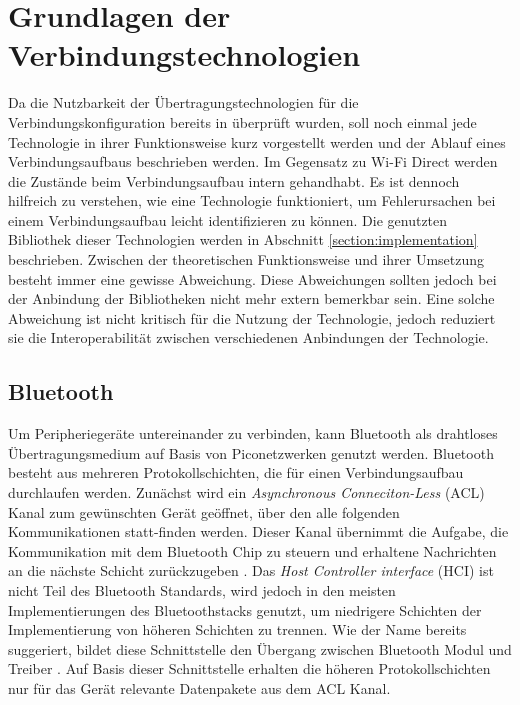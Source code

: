 \section{Grundlagen der Verbindungstechnologien}
	Da die Nutzbarkeit der Übertragungstechnologien für die Verbindungskonfiguration bereits in \cite{aiProject} überprüft wurden, soll noch einmal jede Technologie in ihrer Funktionsweise kurz vorgestellt werden und der Ablauf eines Verbindungsaufbaus beschrieben werden. Im Gegensatz zu Wi-Fi Direct werden die Zustände beim Verbindungsaufbau intern gehandhabt. Es ist dennoch hilfreich zu verstehen, wie eine Technologie funktioniert, um Fehlerursachen bei einem Verbindungsaufbau \linebreak leicht identifizieren zu können. Die genutzten Bibliothek dieser Technologien werden in Abschnitt \ref{section:implementation} beschrieben. Zwischen der theoretischen Funktionsweise und ihrer Umsetzung besteht immer eine gewisse Abweichung. Diese Abweichungen sollten jedoch bei der Anbindung der Bibliotheken nicht mehr extern bemerkbar sein. Eine solche Abweichung ist nicht kritisch für die Nutzung der Technologie, jedoch reduziert sie die Interoperabilität zwischen verschiedenen Anbindungen der Technologie.
	
	\subsection{Bluetooth}
	Um Peripheriegeräte untereinander zu verbinden, kann Bluetooth als drahtloses Übertragungsmedium auf Basis von Piconetzwerken genutzt werden.
	Bluetooth besteht aus mehreren Protokollschichten, die für einen Verbindungsaufbau durchlaufen werden. Zunächst wird ein {\it Asynchronous Conneciton-Less} (ACL) Kanal zum gewünschten Gerät geöffnet, über den alle folgenden Kommunikationen statt-finden werden. Dieser Kanal übernimmt die Aufgabe, die Kommunikation mit dem Bluetooth Chip zu steuern und erhaltene Nachrichten an die nächste Schicht zurückzugeben \cite[S.400]{Sauter}. Das {\it Host Controller interface} (HCI) ist nicht Teil des Bluetooth Standards, wird jedoch in den meisten Implementierungen des Bluetoothstacks genutzt, um niedrigere Schichten der Implementierung von höheren Schichten zu trennen. Wie der Name bereits suggeriert, bildet diese Schnittstelle den Übergang zwischen Bluetooth Modul und Treiber \cite[S.65]{miller}. Auf Basis dieser Schnittstelle erhalten die höheren Protokollschichten nur für das Gerät relevante Datenpakete aus dem ACL Kanal.
	
